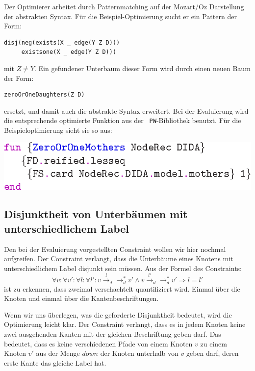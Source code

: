 Der Optimierer arbeitet durch Patternmatching auf der Mozart/Oz
Darstellung der abstrakten Syntax. F\"ur die Beispiel-Optimierung
sucht er ein Pattern der Form:
\begin{verbatim}
disj(neg(exists(X _ edge(Y Z D)))
     existsone(X _ edge(Y Z D)))
\end{verbatim}
mit $Z \neq Y$. Ein gefundener Unterbaum dieser Form wird durch einen
neuen Baum der Form:
\begin{verbatim}
zeroOrOneDaughters(Z D)
\end{verbatim}
ersetzt, und damit auch die abstrakte Syntax erweitert.  Bei der
Evaluierung wird die entsprechende optimierte Funktion aus der {\tt
  PW}-Bibliothek benutzt. F\"ur die Beispieloptimierung sieht sie so
aus:
\begin{center}
\includegraphics[scale=1.0]{eps/opti}
\end{center}

\subsection{Disjunktheit von Unterb\"aumen mit unterschiedlichem Label}
Den bei der Evaluierung vorgestellten Constraint wollen wir hier
nochmal aufgreifen. Der Constraint verlangt, dass die Unterb\"aume
eines Knotens mit unterschiedlichem Label disjunkt sein m\"ussen.  Aus
der Formel des Constraints:
$$\forall v: \forall v' : \forall l: \forall l': v
 \overset{l}{\rightarrow}_d \rightarrow_d^* v' \wedge v
 \overset{l'}{\rightarrow}_d \rightarrow_d^* v' \Rightarrow l=l'
$$
ist zu erkennen, dass zweimal verschachtelt quantifiziert wird. Einmal
 \"uber die Knoten und einmal \"uber die Kantenbeschriftungen.

Wenn wir uns \"uberlegen, was die geforderte Disjunktheit bedeutet,
wird die Optimierung leicht klar. Der Constraint verlangt, dass es in
jedem Knoten keine zwei ausgehenden Kanten mit der gleichen
Beschriftung geben darf. Das bedeutet, dass es keine verschiedenen
Pfade von einem Knoten $v$ zu einem Knoten $v'$ aus der Menge
$\mathit{down}$ der Knoten unterhalb von $v$ geben darf, deren erste
Kante das gleiche Label hat.

